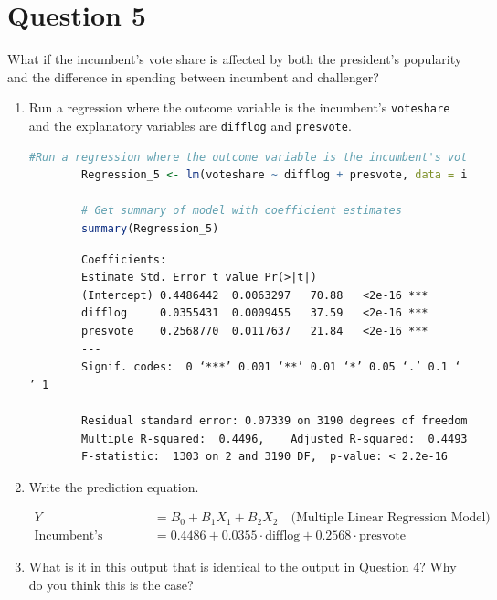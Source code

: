\documentclass[12pt,letterpaper]{article}
\begin{document}
\section*{Question 5}
\noindent What if the incumbent's vote share is affected by both the president's popularity and the difference in spending between incumbent and challenger? 
	\begin{enumerate}
		\item Run a regression where the outcome variable is the incumbent's \texttt{voteshare} and the explanatory variables are \texttt{difflog} and \texttt{presvote}.	\vspace{0cm}
		
		\begin{lstlisting}[language=R, caption={Regression Model 5 in R}, label={lst:regression_model}]
		#Run a regression where the outcome variable is the incumbent's voteshare and the explanatory variables are difflog and presvote.
		Regression_5 <- lm(voteshare ~ difflog + presvote, data = incumbents_subset)
			
		# Get summary of model with coefficient estimates
		summary(Regression_5)
		\end{lstlisting}
		
		\begin{verbatim}
		Coefficients:
		Estimate Std. Error t value Pr(>|t|)    
		(Intercept) 0.4486442  0.0063297   70.88   <2e-16 ***
		difflog     0.0355431  0.0009455   37.59   <2e-16 ***
		presvote    0.2568770  0.0117637   21.84   <2e-16 ***
		---
		Signif. codes:  0 ‘***’ 0.001 ‘**’ 0.01 ‘*’ 0.05 ‘.’ 0.1 ‘ ’ 1
		
		Residual standard error: 0.07339 on 3190 degrees of freedom
		Multiple R-squared:  0.4496,	Adjusted R-squared:  0.4493 
		F-statistic:  1303 on 2 and 3190 DF,  p-value: < 2.2e-16
			\end{verbatim}
		
		\item Write the prediction equation.	\vspace{0cm}
			
		\begin{align*}
		Y &= B_0 + B_1X_1 + B_2X_2 \quad \text{(Multiple Linear Regression Model)} \\
		\text{Incumbent's Voteshare} &= 0.4486 + 0.0355 \cdot \text{difflog} + 0.2568 \cdot \text{presvote}
		\end{align*}
		
		\item What is it in this output that is identical to the output in Question 4? Why do you think this is the case?
		

\end{enumerate}
\end{document}
